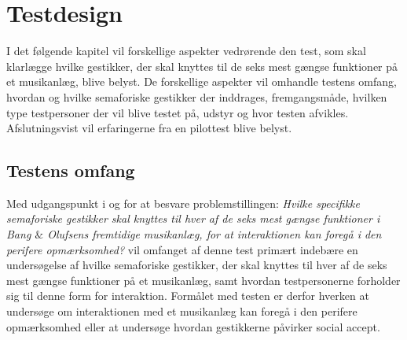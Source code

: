 \chapter{Testdesign}
\label{TestdesignValgAfGestikker}
%
I det følgende kapitel vil forskellige aspekter vedrørende den test, som skal klarlægge hvilke gestikker, der skal knyttes til de seks mest gængse funktioner på et musikanlæg, blive belyst. De forskellige aspekter vil omhandle testens omfang, hvordan og hvilke semaforiske gestikker der inddrages, fremgangsmåde, hvilken type testpersoner der vil blive testet på, udstyr og hvor testen afvikles. Afslutningsvist vil erfaringerne fra en pilottest blive belyst.   
%

\section{Testens omfang}
\label{TestensOmfangValgAfGestikker}
%
Med udgangspunkt i og for at besvare problemstillingen: \textit{Hvilke specifikke semaforiske gestikker skal knyttes til hver af de seks mest gængse funktioner i Bang $\&$ Olufsens fremtidige musikanlæg, for at interaktionen kan foregå i den perifere opmærksomhed?} vil omfanget af denne test primært indebære en undersøgelse af hvilke semaforiske gestikker, der skal knyttes til hver af de seks mest gængse funktioner på et musikanlæg, samt hvordan testpersonerne forholder sig til denne form for interaktion. Formålet med testen er derfor hverken at undersøge om interaktionen med et musikanlæg kan foregå i den perifere opmærksomhed eller at undersøge hvordan gestikkerne påvirker social accept. 


